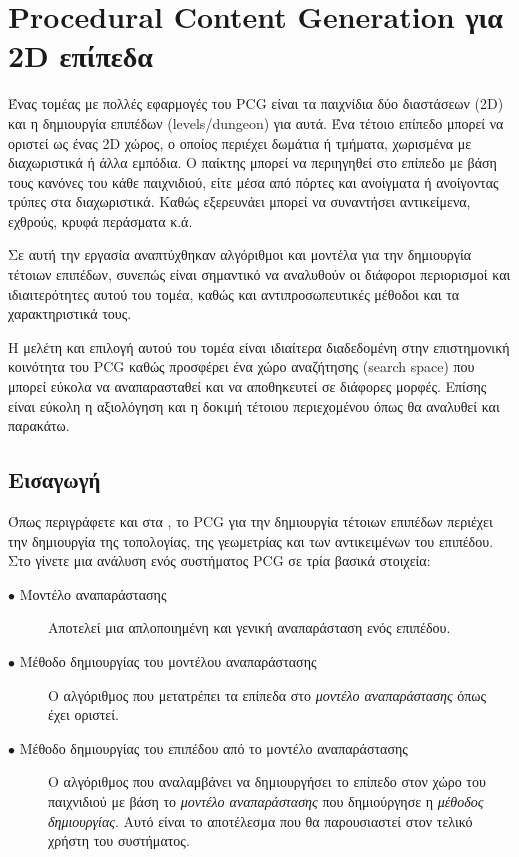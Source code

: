 \section{Procedural Content Generation για 2D επίπεδα}

Ένας τομέας με πολλές εφαρμογές του PCG είναι τα παιχνίδια δύο διαστάσεων (2D) και η δημιουργία επιπέδων (levels/dungeon) για αυτά. Ένα τέτοιο επίπεδο μπορεί να οριστεί ως ένας 2D χώρος, ο οποίος περιέχει δωμάτια ή τμήματα, χωρισμένα με διαχωριστικά ή άλλα εμπόδια. Ο παίκτης μπορεί να περιηγηθεί στο επίπεδο με βάση τους κανόνες του κάθε παιχνιδιού, είτε μέσα από πόρτες και ανοίγματα ή ανοίγοντας τρύπες στα διαχωριστικά. Καθώς εξερευνάει μπορεί να συναντήσει αντικείμενα, εχθρούς, κρυφά περάσματα κ.ά. 
\par
Σε αυτή την εργασία αναπτύχθηκαν αλγόριθμοι και μοντέλα για την δημιουργία τέτοιων επιπέδων, συνεπώς είναι σημαντικό να αναλυθούν οι διάφοροι περιορισμοί και ιδιαιτερότητες αυτού του τομέα, καθώς και αντιπροσωπευτικές μέθοδοι και τα χαρακτηριστικά τους.
\par
Η μελέτη και επιλογή αυτού του τομέα είναι ιδιαίτερα διαδεδομένη στην επιστημονική κοινότητα του PCG καθώς προσφέρει ένα χώρο αναζήτησης (search space) που μπορεί εύκολα να αναπαρασταθεί και να αποθηκευτεί σε διάφορες μορφές. Επίσης είναι εύκολη η αξιολόγηση και η δοκιμή τέτοιου περιεχομένου όπως θα αναλυθεί και παρακάτω.

\subsection{Εισαγωγή}
Όπως περιγράφετε και στα \cite{pcgieee} \cite{pcgig}, το PCG για την δημιουργία τέτοιων επιπέδων περιέχει την δημιουργία της τοπολογίας, της γεωμετρίας και των αντικειμένων του επιπέδου. Στο \cite{pcgig} γίνετε μια ανάλυση ενός συστήματος PCG σε τρία βασικά στοιχεία:

\begin{description}
  \item[$\bullet$ Μοντέλο αναπαράστασης] Αποτελεί μια απλοποιημένη και γενική αναπαράσταση ενός επιπέδου.
  \item[$\bullet$ Μέθοδο δημιουργίας του μοντέλου αναπαράστασης] Ο αλγόριθμος που μετατρέπει τα επίπεδα στο \textit{μοντέλο αναπαράστασης} όπως έχει οριστεί. 
    \item[$\bullet$ Μέθοδο δημιουργίας του επιπέδου από το μοντέλο αναπαράστασης] Ο αλγόριθμος που αναλαμβάνει να δημιουργήσει το επίπεδο στον χώρο του παιχνιδιού με βάση το \textit{μοντέλο αναπαράστασης} που δημιούργησε η \textit{μέθοδος δημιουργίας}. Αυτό είναι το αποτέλεσμα που θα παρουσιαστεί στον τελικό χρήστη του συστήματος.
\end{description}

